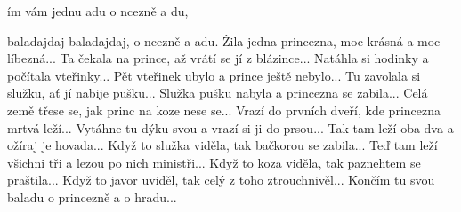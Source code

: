 
\zs
{}ím vám jednu adu o ncezně a du,

baladajdaj baladajdaj, o ncezně a adu.
\ks
\zs
Žila jedna princezna, moc krásná a moc líbezná...
\ks
\zs
Ta čekala na prince, až vrátí se jí z blázince...
\ks
\zs
Natáhla si hodinky a počítala vteřinky...
\ks
\zs
Pět vteřinek ubylo a prince ještě nebylo...
\ks
\zs
Tu zavolala si služku, ať jí nabije pušku...
\ks
\zs
Služka pušku nabyla a princezna se zabila...
\ks
\zs
Celá země třese se, jak princ na koze nese se...
\ks
\zs
Vrazí do prvních dveří, kde princezna mrtvá leží...
\ks
\zs
Vytáhne tu dýku svou a vrazí si ji do prsou...
\ks
\zs
Tak tam leží oba dva a ožíraj je hovada...
\ks
\zs
Když to služka viděla, tak bačkorou se zabila...
\ks
\zs
Teď tam leží všichni tři a lezou po nich ministři...
\ks
\zs
Když to koza viděla, tak paznehtem se praštila...
\ks
\zs
Když to javor uviděl, tak celý z toho ztrouchnivěl...
\ks
\zs
Končím tu svou baladu o princezně a o hradu...
\ks

\kp























